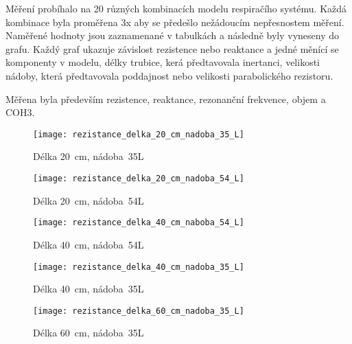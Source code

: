 Měření probíhalo na 20 různých kombinacích modelu respiračího systému. Každá kombinace byla proměřena 3x aby se předešlo nežádoucím nepřesnostem měření. Naměřené hodnoty jsou zaznamenané v tabulkách a následně byly vyneseny do grafu. Každý graf ukazuje závislost rezistence nebo reaktance a jedné měnící se komponenty v modelu, délky trubice, kerá předtavovala inertanci, velikosti nádoby, která předtavovala poddajnost nebo velikosti parabolického rezistoru.

Měřena byla především rezistence, reaktance, rezonanční frekvence, objem a COH3. 

\begin{figure}[h]
	\label{img:pic_rezistance_delka_20_cm_nadoba_35_L}
	\begin{center}
		\texttt{[image: rezistance\_delka\_20\_cm\_nadoba\_35\_L]}
		\caption{Délka 20~cm, nádoba~35L}
	\end{center}
\end{figure}

\begin{figure}[h]
	\label{img:pic_rezistance_delka_20_cm_nadoba_54_L}
	\begin{center}
		\texttt{[image: rezistance\_delka\_20\_cm\_nadoba\_54\_L]}
		\caption{Délka 20~cm, nádoba~54L}
	\end{center}
\end{figure}

\begin{figure}[h]
	\label{img:pic_rezistance_delka_40_cm_naboba_54_L}
	\begin{center}
		\texttt{[image: rezistance\_delka\_40\_cm\_naboba\_54\_L]}
		\caption{Délka 40~cm, nádoba~54L}
	\end{center}
\end{figure}

\begin{figure}[h]
	\label{img:pic_rezistance_delka_40_cm_nadoba_35_L}
	\begin{center}
		\texttt{[image: rezistance\_delka\_40\_cm\_nadoba\_35\_L]}
		\caption{Délka 40~cm, nádoba~35L}
	\end{center}
\end{figure}

\begin{figure}[h]
	\label{img:pic_rezistance_delka_60_cm_nadoba_35_L}
	\begin{center}
		\texttt{[image: rezistance\_delka\_60\_cm\_nadoba\_35\_L]}
		\caption{Délka 60~cm, nádoba~35L}
	\end{center}
\end{figure}

